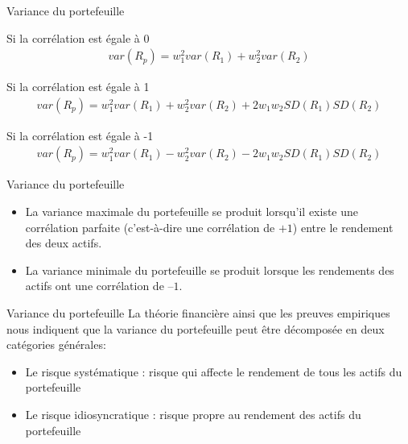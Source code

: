 \documentclass{beamer}
\begin{document}
\begin{frame}{Variance du portefeuille}
\begin{block}{Si la corrélation est égale à 0}
\begin{align*}
var(R_p) = w_1^2 var(R_1) + w_2^2 var(R_2) 
\end{align*}
\end{block}
\begin{block}{Si la corrélation est égale à 1}
\begin{align*}
var(R_p) = w_1^2 var(R_1) + w_2^2 var(R_2) + 2 w_1 w_2 SD(R_1)SD(R_2)
\end{align*}
\end{block}
\begin{block}{Si la corrélation est égale à -1}
\begin{align*}
var(R_p) = w_1^2 var(R_1) - w_2^2 var(R_2) - 2 w_1 w_2 SD(R_1)SD(R_2)
\end{align*}
\end{block}

\end{frame}

\begin{frame}{Variance du portefeuille}
\begin{itemize}[label=\bullet]
\item La variance maximale du portefeuille se produit lorsqu'il existe une corrélation parfaite (c'est-à-dire une corrélation de $+1$) entre le rendement des deux actifs.
\item La variance minimale du portefeuille se produit lorsque les rendements des actifs ont une corrélation de $–1$.
\end{itemize}

\end{frame}


\begin{frame}{Variance du portefeuille}
La théorie financière ainsi que les preuves empiriques nous indiquent que la variance du portefeuille peut être décomposée en deux catégories générales:
\begin{itemize}[label=\bullet]
\item Le risque systématique : risque qui affecte le rendement de tous les actifs du portefeuille
\item Le risque idiosyncratique : risque propre au rendement des actifs du portefeuille
\end{itemize}
\end{frame}
\end{document}
